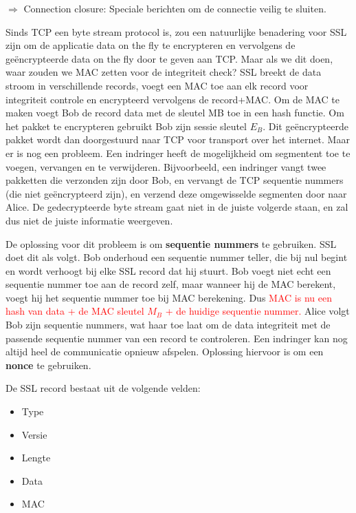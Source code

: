\noindent $\Rightarrow$ Connection closure: Speciale berichten om de connectie veilig te sluiten.

\noindent Sinds TCP een byte stream protocol is, zou een natuurlijke benadering voor SSL zijn om de applicatie data on the fly te encrypteren en vervolgens de geëncrypteerde data on the fly door te geven aan TCP. Maar als we dit doen, waar zouden we MAC zetten voor de integriteit check?
SSL breekt de data stroom in verschillende records, voegt een MAC toe aan elk record voor integriteit controle en encrypteerd vervolgens de record+MAC. Om de MAC te maken voegt Bob de record data met de sleutel MB toe in een hash functie. Om het pakket te encrypteren gebruikt Bob zijn sessie sleutel $E_B$. Dit geëncrypteerde pakket wordt dan doorgestuurd naar TCP voor transport over het internet.
Maar er is nog een probleem. Een indringer heeft de mogelijkheid om segmentent toe te voegen, vervangen en te verwijderen. Bijvoorbeeld, een indringer vangt twee pakketten die verzonden zijn door Bob, en vervangt de TCP sequentie nummers (die niet geëncrypteerd zijn), en verzend deze omgewisselde segmenten door naar Alice.
De gedecrypteerde byte stream gaat niet in de juiste volgerde staan, en zal dus niet de juiste informatie weergeven.

\noindent De oplossing voor dit probleem is om \textbf{sequentie nummers} te gebruiken. SSL doet dit als volgt. Bob onderhoud een sequentie nummer teller, die bij nul begint en wordt verhoogt bij elke SSL record dat hij stuurt. Bob voegt niet echt een sequentie nummer toe aan de record zelf, maar wanneer hij de MAC berekent, voegt hij het sequentie nummer toe bij MAC berekening. Dus \textcolor{red}{MAC is nu een hash van data + de MAC sleutel $M_B$ + de huidige sequentie nummer.}
Alice volgt Bob zijn sequentie nummers, wat haar toe laat om de data integriteit met de passende sequentie nummer van een record te controleren.
Een indringer kan nog altijd heel de communicatie opnieuw afspelen. Oplossing hiervoor is om een \textbf{nonce} te gebruiken.

\newpage


De SSL record bestaat uit de volgende velden:
\begin{itemize}

\item Type
\item Versie
\item Lengte
\item Data
\item MAC
\end{itemize}

